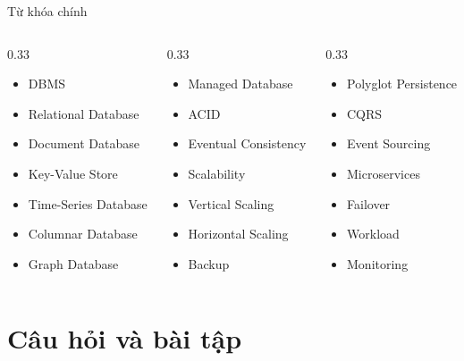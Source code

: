 \documentclass[aspectratio=169,11pt]{beamer}
\newcommand{\smallitem}{\setlength{\itemsep}{2pt}\setlength{\parskip}{0pt}}
\begin{document}
\begin{frame}{Từ khóa chính}
\small
\begin{columns}[T]
\begin{column}{0.33\textwidth}
\begin{itemize}
  \smallitem
  \item DBMS
  \item Relational Database
  \item Document Database
  \item Key-Value Store
  \item Time-Series Database
  \item Columnar Database
  \item Graph Database
\end{itemize}
\end{column}
\begin{column}{0.33\textwidth}
\begin{itemize}
  \smallitem
  \item Managed Database
  \item ACID
  \item Eventual Consistency
  \item Scalability
  \item Vertical Scaling
  \item Horizontal Scaling
  \item Backup
\end{itemize}
\end{column}
\begin{column}{0.33\textwidth}
\begin{itemize}
  \smallitem
  \item Polyglot Persistence
  \item CQRS
  \item Event Sourcing
  \item Microservices
  \item Failover
  \item Workload
  \item Monitoring
\end{itemize}
\end{column}
\end{columns}
\end{frame}

\section{Câu hỏi và bài tập}
\end{document}

